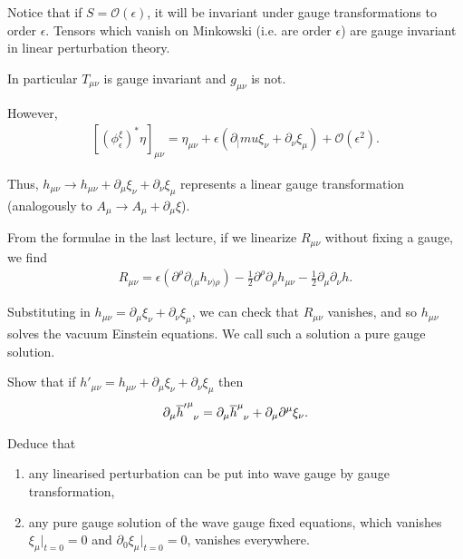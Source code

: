
Notice that if $S = \mathcal{O}\left( \epsilon \right) $, it will be invariant under gauge transformations to order $\epsilon$. Tensors which vanish on Minkowski (i.e. are order $\epsilon$) are gauge invariant in linear perturbation theory.

In particular $T_{\mu \nu}$ is gauge invariant and $g_{\mu \nu}$ is not.

However,
\begin{align}
    \left[ \left( \phi_\epsilon^{\xi} \right)^{*} \eta \right]_{\mu \nu} = \eta_{\mu \nu} + \epsilon \left( \partial_|mu \xi_\nu + \partial_\nu \xi_\mu \right) + \mathcal{O}\left( \epsilon^2 \right) 
.\end{align}

Thus, $h_{\mu \nu} \to h_{\mu \nu} + \partial_\mu \xi_\nu + \partial_\nu \xi_\mu$ represents a linear gauge transformation (analogously to $A_\mu \to A_\mu + \partial_\mu \xi$).

From the formulae in the last lecture, if we linearize $R_{\mu \nu}$ without fixing a gauge, we find
\begin{align}
    R_{\mu \nu} = \epsilon \left( \partial^{\rho} \partial_{(\mu} h_{\nu) \rho} \right) - \frac{1}{2} \partial^{\rho} \partial_\rho h_{\mu \nu} - \frac{1}{2} \partial_\mu \partial_\nu h
.\end{align}

Substituting in $h_{\mu \nu} = \partial_\mu \xi_\nu + \partial_\nu \xi_\mu$, we can check that $R_{\mu \nu}$ vanishes, and so $h_{\mu \nu}$ solves the vacuum Einstein equations. We call such a solution a pure gauge solution.

\begin{exercise}
    Show that if $h'_{\mu \nu} = h_{\mu \nu} + \partial_\mu \xi_\nu + \partial_\nu \xi_\mu$ then
    \begin{align}
    \partial_\mu \tensor{{\overline{h}'}}{^{\mu}_\nu} = \partial_\mu \tensor{\overline{h}}{^{\mu}_{\nu}} + \partial_\mu \partial^{\mu} \xi_{\nu}
    .\end{align}

    Deduce that
    \begin{enumerate}[label=\alph*)]
        \item any linearised perturbation can be put into wave gauge by gauge transformation,
        \item any pure gauge solution of the wave gauge fixed equations, which vanishes $\xi_\mu \bigg|_{t= 0} = 0$ and $\partial_0 \xi_{\mu} \bigg|_{t = 0} = 0$, vanishes everywhere.
    \end{enumerate}
\end{exercise}

